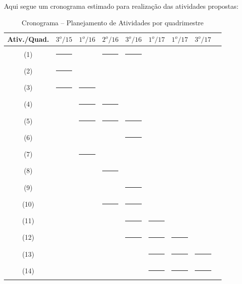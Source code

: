 \documentclass[a4paper,11pt,brazil,fleqn]{article}
\begin{document}
Aqui segue um cronograma estimado para realiza\c{c}\~ao das atividades propostas:

\begin{table}[!ht]
\begin{center}
\caption[Cronograma]{Cronograma -- Planejamento de Atividades por quadrimestre}
\begin{tabular}{|c|c|c|c|c|c|c|c|c|} 
	\hline
	\rule[-2mm]{0mm}{6mm}
	Ativ./Quad. & $3^o/15$ & $1^o/16$ & $2^o/16$ & $3^o/16$ & $1^o/17$ & $1^o/17$ & $3^o/17$ \\
	\hline
	\rule[-2mm]{0mm}{6mm}
	(1) & \rule[0mm]{10mm}{2mm} & & \rule[0mm]{10mm}{2mm} & \rule[0mm]{10mm}{2mm} &  & &   \\
	\rule[-1mm]{0mm}{5mm}
	(2) & \rule[0mm]{10mm}{2mm} &  &  &  &  &  &   \\
	\rule[-1mm]{0mm}{5mm}
	(3) & \rule[0mm]{10mm}{2mm} & \rule[0mm]{10mm}{2mm} &  &  &  &
	&  \\
	\rule[-1mm]{0mm}{5mm}
	(4) &  & \rule[0mm]{10mm}{2mm}  & \rule[0mm]{10mm}{2mm}  &  &  &  &\\
	\rule[-1mm]{0mm}{5mm}
	(5) &   & \rule[0mm]{10mm}{2mm} & \rule[0mm]{10mm}{2mm} & \rule[0mm]{10mm}{2mm} &  &  &\\
	\rule[-1mm]{0mm}{5mm}
	(6) &   &  &  & \rule[0mm]{10mm}{2mm} &  & & \\
	\rule[-1mm]{0mm}{5mm}
	(7) &  & \rule[0mm]{10mm}{2mm} &  &  &  &  &\\ 
	\rule[-1mm]{0mm}{5mm}
	(8) &  &  & \rule[0mm]{10mm}{2mm} &  &  &  &\\
	\rule[-1mm]{0mm}{5mm}
	(9) &  &  &  & \rule[0mm]{10mm}{2mm} &  &  &\\
	\rule[-1mm]{0mm}{5mm}
	(10) &  &  & \rule[0mm]{10mm}{2mm} & \rule[0mm]{10mm}{2mm} &  &  & \  \\
	\rule[-2mm]{0mm}{6mm}
	(11) &  &  &  & \rule[0mm]{10mm}{2mm} & \rule[0mm]{10mm}{2mm} &  & \\
	\rule[-2mm]{0mm}{6mm}
	(12) &  &  &  & \rule[0mm]{10mm}{2mm} & \rule[0mm]{10mm}{2mm} & \rule[0mm]{10mm}{2mm} &  \\
	\rule[-2mm]{0mm}{6mm}
	(13) &  &  &  &  & \rule[0mm]{10mm}{2mm} & \rule[0mm]{10mm}{2mm} & \rule[0mm]{10mm}{2mm} \\
	\rule[-2mm]{0mm}{6mm}
	(14) &  &  &  &  & \rule[0mm]{10mm}{2mm} & \rule[0mm]{10mm}{2mm} & \rule[0mm]{10mm}{2mm} \\
	\hline
\end{tabular} 
\label{crono}
\end{center}
\end{table}





{} 



\end{document}
